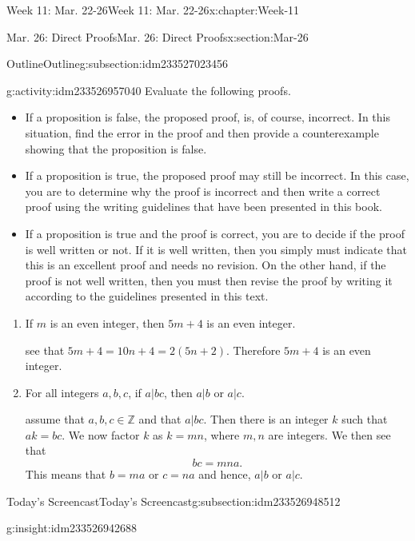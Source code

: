 \documentclass[oneside,10pt,]{book}
\numberwithin{equation}{section}
\def\Z{{\mathbb Z}}
\newcommand{\Z}{\mathbb Z}
\begin{document}
\begin{chapterptx}{Week 11: Mar. 22-26}{}{Week 11: Mar. 22-26}{}{}{x:chapter:Week-11}
\begin{sectionptx}{Mar. 26: Direct Proofs}{}{Mar. 26: Direct Proofs}{}{}{x:section:Mar-26}
\begin{subsectionptx}{Outline}{}{Outline}{}{}{g:subsection:idm233527023456}
\begin{activity}{}{g:activity:idm233526957040}
Evaluate the following proofs.%
\begin{itemize}[label=\textbullet]
\item{}If a proposition is false, the proposed proof, is, of course, incorrect. In this situation, find the error in the proof and then provide a counterexample showing that the proposition is false.%
\item{}If a proposition is true, the proposed proof may still be incorrect. In this case, you are to determine why the proof is incorrect and then write a correct proof using the writing guidelines that have been presented in this book.%
\item{}If a proposition is true and the proof is correct, you are to decide if the proof is well written or not. If it is well written, then you simply must indicate that this is an excellent proof and needs no revision. On the other hand, if the proof is not well written, then you must then revise the proof by writing it according to the guidelines presented in this text.%
\end{itemize}
%
%
\begin{enumerate}
\item{}If \(m\) is an even integer, then \(5m+4\) is an even integer.%
\par\smallskip%
\noindentWe see that \(5m+4 = 10n +4 = 2(5n+2)\). Therefore \(5m+4\) is an even integer.%
\item{}For all integers \(a,b,c\), if \(a|bc\), then \(a|b\) or \(a|c\).%
\par\smallskip%
\noindentWe assume that \(a,b,c\in\Z\) and that \(a|bc\). Then there is an integer \(k\) such that \(ak=bc\). We now factor \(k\) as \(k=mn\), where \(m,n\) are integers. We then see that%
\begin{equation*}
bc = mna.
\end{equation*}
This means that \(b=ma\) or \(c=na\) and hence, \(a|b\) or \(a|c\).%
\end{enumerate}
\end{activity}%
\end{subsectionptx}
%
%
\typeout{************************************************}
\typeout{************************************************}
%
\begin{subsectionptx}{Today's Screencast}{}{Today's Screencast}{}{}{g:subsection:idm233526948512}
\begin{insight}{}{g:insight:idm233526942688}%
\end{insight}
\end{subsectionptx}

\end{sectionptx}
\end{chapterptx}
\end{document}
